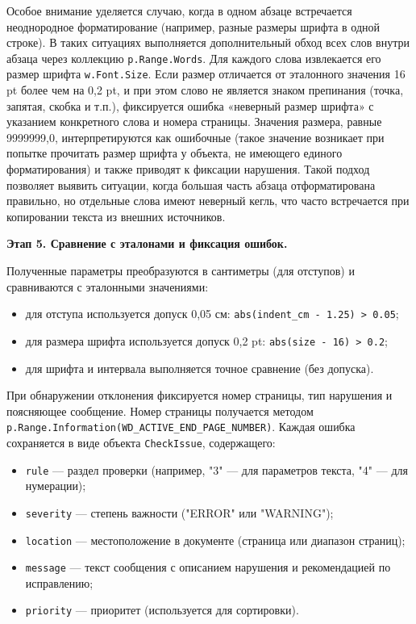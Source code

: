 Особое внимание уделяется случаю, когда в одном абзаце встречается неоднородное форматирование (например, разные размеры шрифта в одной строке). В таких ситуациях выполняется дополнительный обход всех слов внутри абзаца через коллекцию \texttt{p.Range.Words}. Для каждого слова извлекается его размер шрифта \texttt{w.Font.Size}. Если размер отличается от эталонного значения 16 pt более чем на 0,2 pt, и при этом слово не является знаком препинания (точка, запятая, скобка и т.п.), фиксируется ошибка «неверный размер шрифта» с указанием конкретного слова и номера страницы. Значения размера, равные 9999999,0, интерпретируются как ошибочные (такое значение возникает при попытке прочитать размер шрифта у объекта, не имеющего единого форматирования) и также приводят к фиксации нарушения. Такой подход позволяет выявить ситуации, когда большая часть абзаца отформатирована правильно, но отдельные слова имеют неверный кегль, что часто встречается при копировании текста из внешних источников.

\textbf{Этап 5. Сравнение с эталонами и фиксация ошибок.}

Полученные параметры преобразуются в сантиметры (для отступов) и сравниваются с эталонными значениями:

\begin{itemize}
	\item для отступа используется допуск 0,05 см: \texttt{abs(indent\_cm - 1.25) > 0.05};
	\item для размера шрифта используется допуск 0,2 pt: \texttt{abs(size - 16) > 0.2};
	\item для шрифта и интервала выполняется точное сравнение (без допуска).
\end{itemize}

При обнаружении отклонения фиксируется номер страницы, тип нарушения и поясняющее сообщение. Номер страницы получается методом \texttt{p.Range.Information(WD\_ACTIVE\_END\_PAGE\_NUMBER)}. Каждая ошибка сохраняется в виде объекта \texttt{CheckIssue}, содержащего:

\begin{itemize}
	\item \texttt{rule} — раздел проверки (например, "3" — для параметров текста, "4" — для нумерации);
	\item \texttt{severity} — степень важности ("ERROR" или "WARNING");
	\item \texttt{location} — местоположение в документе (страница или диапазон страниц);
	\item \texttt{message} — текст сообщения с описанием нарушения и рекомендацией по исправлению;
	\item \texttt{priority} — приоритет (используется для сортировки).
\end{itemize}

